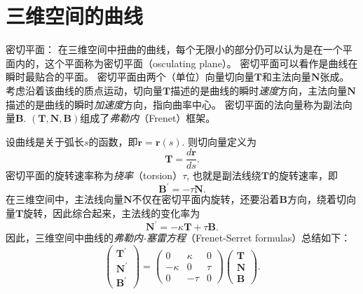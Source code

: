 \documentclass{article}
\begin{document}
\section{三维空间的曲线}

密切平面：
在三维空间中扭曲的曲线，每个无限小的部分仍可以认为是在一个平面内的，这个平面称为密切平面（osculating plane）。
密切平面可以看作是曲线在瞬时最贴合的平面。
密切平面由两个（单位）向量切向量$\mathbf{T}$和主法向量$\mathbf{N}$张成。
考虑沿着该曲线的质点运动，切向量$\mathbf{T}$描述的是曲线的瞬时\emph{速度}方向，主法向量$\mathbf{N}$描述的是曲线的瞬时\emph{加速度}方向，指向曲率中心。
密切平面的法向量称为副法向量$\mathbf{B}$.
$(\mathbf{T}, \mathbf{N}, \mathbf{B})$组成了\emph{弗勒内}（Frenet）框架。

设曲线是关于弧长$s$的函数，即$\mathbf{r}=\mathbf{r}(s)$.
则切向量定义为
\begin{equation*}
    \mathbf{T}=\frac{d\mathbf{r}}{ds}.
\end{equation*}
密切平面的旋转速率称为\emph{挠率}（torsion）$\tau$, 也就是副法线绕$\mathbf{T}$的旋转速率，即
\begin{equation}
    \mathbf{B}^{\prime}=-\tau\mathbf{N}.
\end{equation}
在三维空间中，主法线向量$\mathbf{N}$不仅在密切平面内旋转，还要沿着$\mathbf{B}$方向，绕着切向量$\mathbf{T}$旋转，因此综合起来，主法线的变化率为
\begin{equation}
    \mathbf{N}^{\prime}=-\kappa\mathbf{T}+\tau\mathbf{B}.
\end{equation}
因此，三维空间中曲线的\emph{弗勒内-塞雷方程}（Frenet-Serret formulas）总结如下：
\begin{equation}
    \begin{pmatrix}
        \mathbf{T}^{\prime} \\
        \mathbf{N}^{\prime} \\
        \mathbf{B}^{\prime}
    \end{pmatrix}
    =
    \begin{pmatrix}
        0 & \kappa & 0 \\
        -\kappa & 0 & \tau \\
        0 & -\tau & 0
    \end{pmatrix}
    \begin{pmatrix}
        \mathbf{T} \\
        \mathbf{N} \\
        \mathbf{B}
    \end{pmatrix}.
\end{equation}
\end{document}
